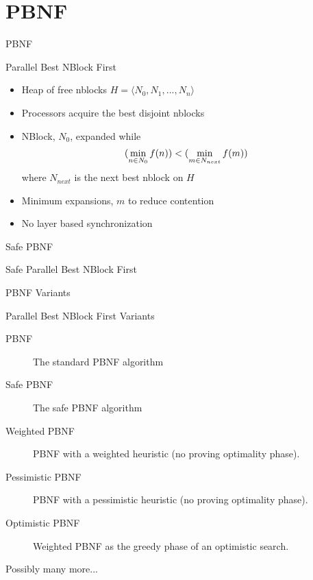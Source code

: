 \documentclass[style=unh]{powerdot}
\begin{document}
\section{PBNF}


\begin{slide}{PBNF}
  \vspace{.2in}
  \begin{center}
    Parallel Best NBlock First
  \end{center}

  \begin{itemize}
  \item Heap of free nblocks $H = \langle N_0, N_1, ..., N_n \rangle$
  \item Processors acquire the best disjoint nblocks
  \item NBlock, $N_0$, expanded while
    \begin{eqnarray*}
      (\mathop{\rm min}_{n \in N_0} f(n)) < (\mathop{\rm min}_{m \in N_{next}} f(m))
    \end{eqnarray*}
    where $N_{next}$ is the next best nblock on $H$
  \item Minimum expansions, $m$ to reduce contention
  \item No layer based synchronization
  \end{itemize}

\end{slide}


\begin{slide}{Safe PBNF}
  \vspace{.2in}
  \begin{center}
    Safe Parallel Best NBlock First
  \end{center}
\end{slide}


\begin{slide}{PBNF Variants}
  \vspace{.2in}
  \begin{center}
    Parallel Best NBlock First Variants
  \end{center}
  \begin{description}
  \item[PBNF] The standard PBNF algorithm
  \item[Safe PBNF] The safe PBNF algorithm
  \item[Weighted PBNF] PBNF with a weighted heuristic (no proving
    optimality phase).
  \item[Pessimistic PBNF] PBNF with a pessimistic heuristic (no proving
    optimality phase).
  \item[Optimistic PBNF] Weighted PBNF as the greedy phase of an optimistic search.
  \item[Possibly many more...]
  \end{description}
\end{slide}
\end{document}
